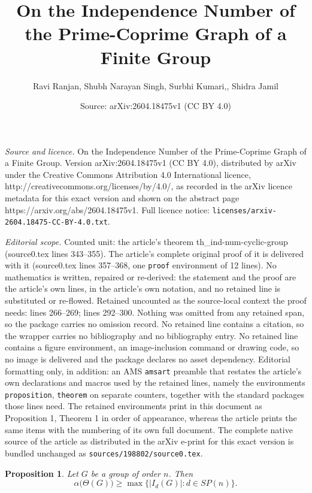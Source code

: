 \documentclass[10pt,a4paper]{amsart}
\title{On the Independence Number of the Prime-Coprime Graph of a Finite Group}
\author{Ravi Ranjan, Shubh Narayan Singh, Surbhi Kumari,, Shidra Jamil}
\date{Source: arXiv:2604.18475v1 (CC BY 4.0)}
\newtheorem{proposition}{Proposition}
\begin{document}
\maketitle

\noindent\emph{Source and licence.} On the Independence Number of the Prime-Coprime Graph of a Finite Group. Version arXiv:2604.18475v1 (CC BY 4.0), distributed by arXiv under the Creative Commons Attribution 4.0 International licence, http://creativecommons.org/licenses/by/4.0/, as recorded in the arXiv licence metadata for this exact version and shown on the abstract page https://arxiv.org/abs/2604.18475v1. Full licence notice: \texttt{licenses/arxiv-2604.18475-CC-BY-4.0.txt}.\par\smallskip

\noindent\textit{Editorial scope.} Counted unit: the article's theorem th\_ind-num-cyclic-group (source0.tex lines 343--355). The article's complete original proof of it is delivered with it (source0.tex lines 357--368, one \texttt{proof} environment of 12 lines). No mathematics is written, repaired or re-derived: the statement and the proof are the article's own lines, in the article's own notation, and no retained line is substituted or re-flowed.  Retained uncounted as the source-local context the proof needs: lines 266--269; lines 292--300.  Nothing was omitted from any retained span, so the package carries no omission record.  No retained line contains a citation, so the wrapper carries no bibliography and no bibliography entry.  No retained line contains a figure environment, an image-inclusion command or drawing code, so no image is delivered and the package declares no asset dependency.  Editorial formatting only, in addition: an AMS \texttt{amsart} preamble that restates the article's own declarations and macros used by the retained lines, namely the environments \texttt{proposition}, \texttt{theorem} on separate counters, together with the standard packages those lines need.  The retained environments print in this document as Proposition 1, Theorem 1 in order of appearance, whereas the article prints the same items with the numbering of its own full document.  The complete native source of the article as distributed in the arXiv e-print for this exact version is bundled unchanged as \texttt{sources/198802/source0.tex}.
\begin{proposition}\label{pr_lower-bound-for-ind-num}
Let $G$ be a group of order $n$. Then 
	\[\alpha\bigl(\Theta(G)\bigr) \geq \max\bigl\{|I_d(G)|\colon d\in SP(n)\bigr\}.\]
\end{proposition}
\end{document}
